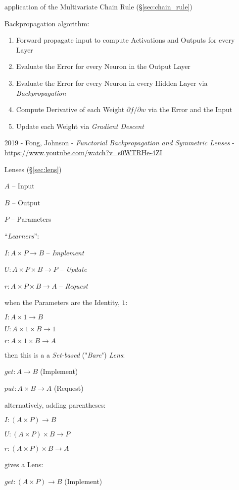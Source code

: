 application of the Multivariate Chain Rule (\S\ref{sec:chain_rule})

Backpropagation algorithm:
\begin{enumerate}
  \item Forward propagate input to compute Activations and Outputs for every
    Layer
  \item Evaluate the Error for every Neuron in the Output Layer
  \item Evaluate the Error for every Neuron in every Hidden Layer via
    \emph{Backpropagation}
  \item Compute Derivative of each Weight $\partial f / \partial w$ via the
    Error and the Input
  \item Update each Weight via \emph{Gradient Descent}
\end{enumerate}

\asterism

2019 - Fong, Johnson - \emph{Functorial Backpropagation and Symmetric Lenses} -
\url{https://www.youtube.com/watch?v=s0WTRHe-4ZI}

\fist Lenses (\S\ref{sec:lens})

$A$ -- Input

$B$ -- Output

$P$ -- Parameters

``\emph{Learners}'':

$I : A \times P \to B$ -- \emph{Implement}

$U : A \times P \times B \to P$ -- \emph{Update}

$r : A \times P \times B \to A$ -- \emph{Request}

when the Parameters are the Identity, $1$:

$I : A \times 1 \to B$

$U : A \times 1 \times B \to 1$

$r : A \times 1 \times B \to A$

then this is a a \emph{Set-based} ("\emph{Bare}") \emph{Lens}:

$get : A \to B$ (Implement)

$put : A \times B \to A$ (Request)

alternatively, adding parentheses:

$I : (A \times P) \to B$

$U : (A \times P) \times B \to P$

$r : (A \times P) \times B \to A$

gives a Lens:

$get : (A \times P) \to B$ (Implement)

